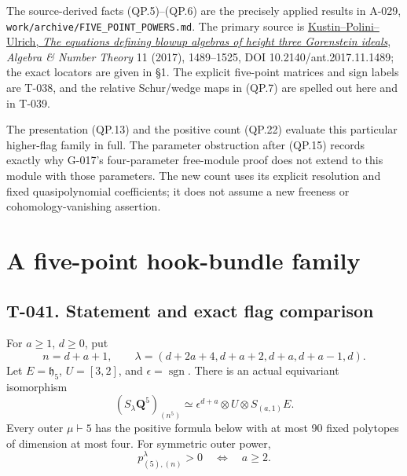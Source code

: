 \documentclass[
  10pt,
]{article}
\begin{document}
The source-derived facts (QP.5)--(QP.6) are the precisely applied
results in A-029,
\texttt{\small work/\allowbreak{}archive/\allowbreak{}FIVE\_\allowbreak{}POINT\_\allowbreak{}POWERS.md}.
The primary source is
\href{https://msp.org/ant/2017/11-7/ant-v11-n7-p01-p.pdf}{Kustin--Polini--Ulrich,
\emph{The equations defining blowup algebras of height three Gorenstein
ideals}}, \emph{Algebra \& Number Theory} 11 (2017), 1489--1525, DOI
10.2140/ant.2017.11.1489; the exact locators are given in §1. The
explicit five-point matrices and sign labels are T-038, and the relative
Schur/wedge maps in (QP.7) are spelled out here and in T-039.

The presentation (QP.13) and the positive count (QP.22) evaluate this
particular higher-flag family in full. The parameter obstruction after
(QP.15) records exactly why G-017's four-parameter free-module proof
does not extend to this module with those parameters. The new count uses
its explicit resolution and fixed quasipolynomial coefficients; it does
not assume a new freeness or cohomology-vanishing assertion.

\section{A five-point hook-bundle
family}\label{a-five-point-hook-bundle-family}

\subsection{T-041. Statement and exact flag
comparison}\label{t-041.-statement-and-exact-flag-comparison}

For \(a\ge1\), \(d\ge0\), put \[
n=d+a+1,\qquad
\lambda=(d+2a+4,d+a+2,d+a,d+a-1,d).
\tag{5H.1}
\] Let \(E=\mathfrak h_5\), \(U=[3,2]\), and
\(\epsilon=\operatorname{sgn}\). There is an actual equivariant
isomorphism \[
\boxed{(S_\lambda\mathbf Q^5)_{(n^5)}
\simeq\epsilon^{d+a}\otimes U\otimes S_{(a,1)}E.}
\tag{5H.2}
\] Every outer \(\mu\vdash5\) has the positive formula below with at
most 90 fixed polytopes of dimension at most four. For symmetric outer
power, \[
\boxed{p_{(5),(n)}^\lambda>0\quad\Longleftrightarrow\quad a\ge2.}
\tag{5H.3}
\]
\end{document}
